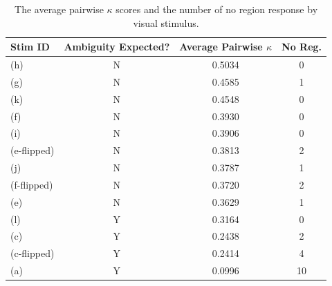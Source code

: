 \documentclass[11pt,letterpaper]{article}
\begin{document}
\begin{table}[htb]
\begin{center}
\begin{tabular}{l c c c}
Stim ID & Ambiguity Expected? & Average Pairwise $\kappa$ & No Reg.\\
\hline
\hline
(h) & N & 0.5034 & 0\\ %
(g) & N & 0.4585 & 1\\ %
(k) & N & 0.4548 & 0\\ %
(f) & N & 0.3930 & 0\\ %
(i) & N & 0.3906 & 0\\ %
(e-flipped) & N & 0.3813 & 2\\ %
(j) & N & 0.3787 & 1\\ %
(f-flipped) & N & 0.3720 & 2\\ %
(e) & N & 0.3629 & 1\\ %
(l) & Y & 0.3164& 0\\ %
(c) & Y & 0.2438 & 2\\ %
(c-flipped) & Y & 0.2414 & 4\\ %
(a) & Y & 0.0996 & 10 \\ %
\hline
\end{tabular}
\end{center}
\caption{The average pairwise $\kappa$ scores and the number of no region response by visual stimulus.}
\label{tab:stimuli-kappa-scores}
\end{table}





\end{document}
